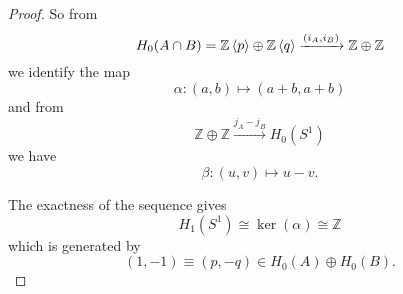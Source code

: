 \documentclass[a4paper,11pt]{article}
\begin{document}
\begin{proof}
		So from
		\[
			H_0 (A \cap B) = \mathbb{Z}\expval{p} \oplus \mathbb{Z} \expval{q} \xrightarrow{(i_A,i_B)} \mathbb{Z} \oplus \mathbb{Z}
		\]
		we identify the map
		\[
			\alpha : (a,b) \mapsto (a+b , a+b)
		\]
		and from
		\[
			\mathbb{Z} \oplus \mathbb{Z} \xrightarrow{j_A - j_B} H_0 (S^1)
		\]
		we have
		\[
			\beta : (u,v) \mapsto u-v.
		\]
		
		The exactness of the sequence gives
		\[
			H_1(S^1) \cong \ker(\alpha) \cong \mathbb{Z}
		\]
		which is generated by 
		\[
			(1,-1) \equiv (p, -q) \in H_0(A) \oplus H_0(B).
		\]
	\end{proof}
\end{document}
